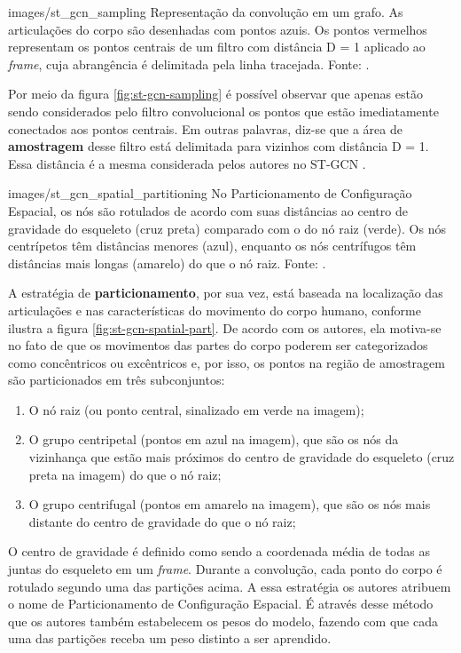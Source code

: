     {images/st_gcn_sampling}
    {Representação da convolução em um grafo. As articulações do corpo são desenhadas com pontos azuis. Os pontos vermelhos representam os pontos centrais de um filtro com distância D = 1 aplicado ao \textit{frame}, cuja abrangência é delimitada pela linha tracejada. Fonte: \cite[p. 5]{st-gcn-2018}.}

Por meio da figura \ref{fig:st-gcn-sampling} é possível observar que apenas estão sendo considerados pelo filtro convolucional os pontos que estão imediatamente conectados aos pontos centrais. Em outras palavras, diz-se que a área de \textbf{amostragem} desse filtro está delimitada para vizinhos com distância D = 1. Essa distância é a mesma considerada pelos autores no ST-GCN \cite{st-gcn-2018}.

    {images/st_gcn_spatial_partitioning}
    {No Particionamento de Configuração Espacial, os nós são rotulados de acordo com suas distâncias ao centro de gravidade do esqueleto (cruz preta) comparado com o do nó raiz (verde). Os nós centrípetos têm distâncias menores (azul), enquanto os nós centrífugos têm distâncias mais longas (amarelo) do que o nó raiz. Fonte: \cite[p. 5]{st-gcn-2018}.}
    
A estratégia de \textbf{particionamento}, por sua vez,  está baseada na localização das articulações e nas características do movimento do corpo humano, conforme ilustra a figura \ref{fig:st-gcn-spatial-part}. De acordo com os autores, ela motiva-se no fato de que os movimentos das partes do corpo poderem ser categorizados como concêntricos ou excêntricos e, por isso, os pontos na região de amostragem são particionados em três subconjuntos:

\begin{enumerate}
    \item O nó raiz (ou ponto central, sinalizado em verde na imagem);
    \item O grupo centripetal (pontos em azul na imagem), que são os nós da vizinhança que estão mais próximos do centro de gravidade do esqueleto (cruz preta na imagem) do que o nó raiz;
    \item O grupo centrifugal (pontos em amarelo na imagem), que são os nós mais distante do centro de gravidade do que o nó raiz;
\end{enumerate}

O centro de gravidade é definido como sendo a coordenada média de todas as juntas do esqueleto em um \textit{frame}. Durante a convolução, cada ponto do corpo é rotulado segundo uma das partições acima. A essa estratégia os autores atribuem o nome de Particionamento de Configuração Espacial. É através desse método que os autores também estabelecem os pesos do modelo, fazendo com que cada uma das partições receba um peso distinto a ser aprendido.


